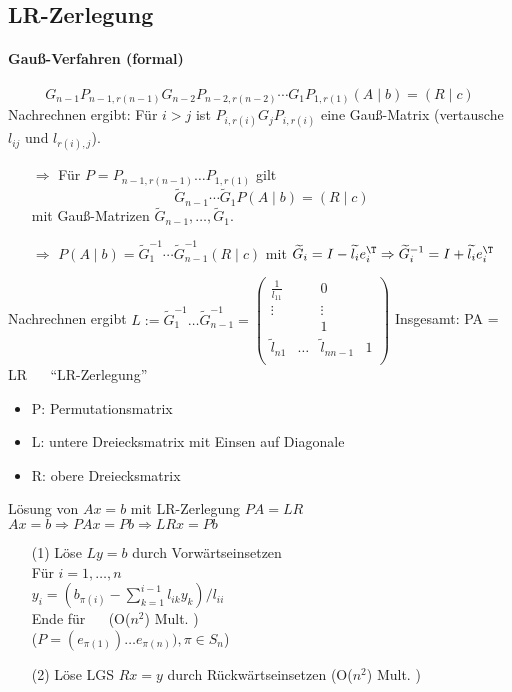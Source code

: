 
\subsection{LR-Zerlegung}

\paragraph{Gauß-Verfahren (formal)}
$$G_{n-1} P_{n-1,r(n-1)}G_{n-2}P_{n-2,r(n-2)} \cdots G_1P_{1,r(1)}(A \mid b) = (R \mid c)$$
Nachrechnen ergibt: Für $i>j$ ist $P_{i,r(i)} G_jP_{i,r(i)}$ eine Gauß-Matrix
(vertausche $l_{ij}$ und $l_{r(i),j}$).

\begin{itemize}
\item[$\Rightarrow$] Für $P = P_{n-1,r(n-1)} \dots P_{1,r(1)}$ gilt
    $$\widetilde{G}_{n-1} \cdots \widetilde{G}_1 P (A \mid b) = (R \mid c)$$
    mit Gauß-Matrizen $\widetilde{G}_{n-1}, \dots, \widetilde{G}_1$.

\item[$\Rightarrow$] $P (A \mid b) =
    \widetilde{G}_1^{-1} \cdots \widetilde{G}_{n-1}^{-1} (R \mid c)$
    mit $\widetilde{G}_i = I - \widetilde{l_i} e_i^\T
         \Rightarrow \widetilde{G}_i^{-1} = I + \widetilde{l_i} e_i^\T$
\end{itemize}

Nachrechnen ergibt
$L := \widetilde{G}_1^{-1} \dots \widetilde{G}_{n-1}^{-1} =
\begin{pmatrix}
\frac{1}{l_{11}} & & 0 \\
\vdots & & \vdots \\
& & 1 & \\
\widetilde{l}_{n1} & \dots & \widetilde{l}_{nn-1} & 1 \\
\end{pmatrix}$
Insgesamt: PA = LR ~~ "`LR-Zerlegung"'
\begin{itemize}
\item P: Permutationsmatrix
\item L: untere Dreiecksmatrix mit Einsen auf Diagonale
\item R: obere Dreiecksmatrix
\end{itemize}

Lösung von $Ax = b$ mit LR-Zerlegung $PA=LR$ \\
$Ax=b \Rightarrow PAx = Pb \Rightarrow LRx = Pb$
\begin{enumerate}
\item[(1)]
Löse $Ly = b$ durch Vorwärtseinsetzen \\
Für $i = 1, \dots ,n$ \\
$y_i = \left( b_{\pi(i)} - \sum_{k = 1}^{i -1} l_{ik} y_k  \right) / l_{ii}$ \\
Ende für  ~~ (O($n^2$) Mult. )\\
($P = (e_{\pi(1)}) \dots e_{\pi(n)}), \pi \in S_n$)
\item[(2)]
Löse LGS $Rx = y$ durch Rückwärtseinsetzen (O($n^2$) Mult. )
\end{enumerate}


